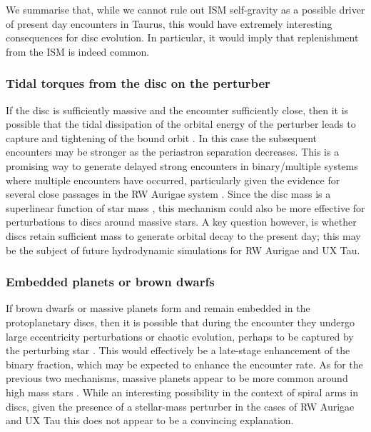 \documentclass{aa}
\begin{document}
{We summarise that, while we cannot rule out ISM self-gravity as a possible driver of present day encounters in Taurus, this would have extremely interesting consequences for disc evolution. In particular, it would imply that replenishment from the ISM is indeed common.}

\subsubsection{Tidal torques from the disc on the perturber}

If the disc is sufficiently massive and the encounter sufficiently close, then it is possible that the tidal dissipation of the orbital energy of the perturber leads to capture and tightening of the bound orbit \citep{Clarke93, Ostriker94, Munoz15}. In this case the subsequent encounters may be stronger as the periastron separation decreases. This is a promising way to generate delayed strong encounters in binary/multiple systems where multiple encounters have occurred, particularly given the evidence for several close passages in the RW Aurigae system \citep{Rodriguez18}. Since the disc mass is a superlinear function of star mass \citep[e.g.][]{Ansdell16}, this mechanism could also be more effective for perturbations to discs around massive stars. A key question however, is whether discs retain sufficient mass to generate orbital decay to the present day; this may be the subject of future hydrodynamic simulations for RW Aurigae and UX Tau.


 \subsubsection{Embedded planets or brown dwarfs}
 
 If brown dwarfs or massive planets form and remain embedded in the protoplanetary discs, then it is possible that during the encounter they undergo large eccentricity perturbations \citep{Heg96} or chaotic evolution, perhaps to be captured by the perturbing star \citep[e.g.][]{Fregeau04}. This would effectively be a late-stage enhancement of the binary fraction, which may be expected to enhance the encounter rate. As for the previous two mechanisms, massive planets appear to be more common around high mass stars \citep{Johnson10}. While an interesting possibility in the context of spiral arms in discs, given the presence of a stellar-mass perturber in the cases of RW Aurigae and UX Tau this does not appear to be a convincing explanation. 
\end{document}
